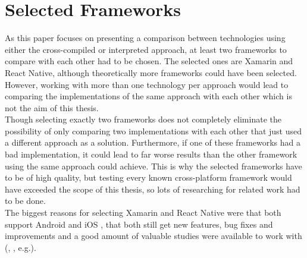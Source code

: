 \documentclass[Bachelor,BIF,english]{twbook}
\begin{document}
\chapter{Selected Frameworks}
As this paper focuses on presenting a comparison between technologies using either the cross-compiled or interpreted approach, at least two frameworks to compare with each other had to be chosen. The selected ones are Xamarin and React Native, although theoretically more frameworks could have been selected. However, working with more than one technology per approach would lead to comparing the implementations of the same approach with each other which is not the aim of this thesis. 
\\[\baselineskip]
Though selecting exactly two frameworks does not completely eliminate the possibility of only comparing two implementations with each other that just used a different approach as a solution. Furthermore, if one of these frameworks had a bad implementation, it could lead to far worse results than the other framework using the same approach could achieve. This is why the selected frameworks have to be of high quality, but testing every known cross-platform framework would have exceeded the scope of this thesis, so lots of researching for related work had to be done. 
\\[\baselineskip]
The biggest reasons for selecting Xamarin and React Native were that both support Android and iOS \cite[p.~1]{JohanssonSderberg2018} \cite[p.~12]{ZubaBernhard2017EdPb}, that both still get new features, bug fixes and improvements \cite{XamarinRoadmap} \cite{ReactNativeRoadmap} and a good amount of valuable studies were available to work with (\cite{Danielsson_2016}, \cite{MartinezLecomte2018}, \cite{GaouarBenamarBendimerad2016} e.g.).
\end{document}
